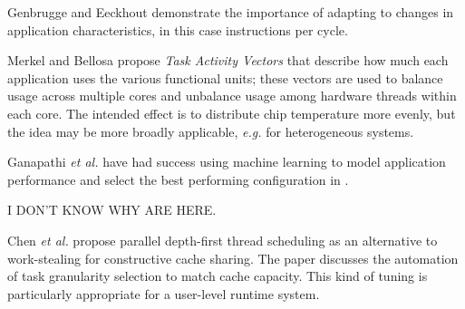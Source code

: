 Genbrugge and Eeckhout\cite{genbrugge-isca07} demonstrate the importance of adapting to changes in application characteristics, in this case instructions per cycle.

Merkel and Bellosa\cite{merkel-eurosys08} propose \emph{Task Activity Vectors} that describe how much each application uses the various functional units; these vectors are used to balance usage across multiple cores and unbalance usage among hardware threads within each core.
The intended effect is to distribute chip temperature more evenly, but the idea may be more broadly applicable, \emph{e.g.} for heterogeneous systems.

Ganapathi \emph{et al.} have had success using machine learning to model application performance and select the best performing configuration in \cite{Archana}.

I DON'T KNOW WHY
\cite{975344,wasserman-book}
ARE HERE.

%
Chen \emph{et al.}\cite{1248396} propose parallel depth-first thread scheduling as an alternative to work-stealing for constructive cache sharing.
The paper discusses the automation of task granularity selection to match cache capacity. This kind of tuning is particularly appropriate for a user-level runtime system. 